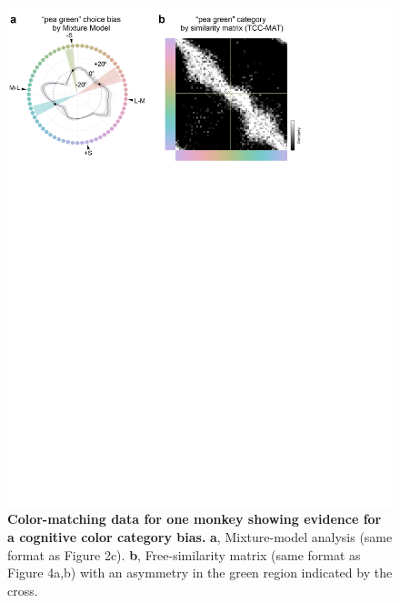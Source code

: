 \begin{figure}
    \begin{fullwidth}
    \centering
    \includegraphics[width=\textwidth+4cm,trim={0 18cm 0 0},clip]{../Figures/flat/F5_CastorCogBias_6.jpg}
    \caption{\textbf {Color-matching data for one monkey showing evidence for a cognitive color category bias.} 
    \textbf{a}, Mixture-model analysis (same format as Figure 2c). 
	\textbf{b}, Free-similarity matrix (same format as Figure 4a,b) with an asymmetry in the green region indicated by the cross.}
    \label{fig:IndiDataCogBias}
    \end{fullwidth}
\end{figure}

